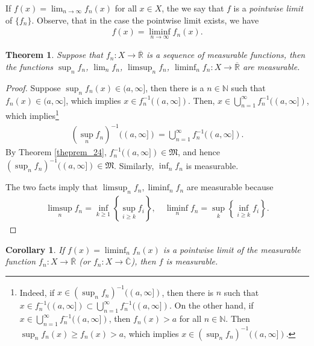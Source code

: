 \documentclass[11pt]{book}
\newtheorem{theorem}{Theorem}[chapter]
\newtheorem{corollary}{Corollary}[theorem]
\theoremstyle{definition}
\numberwithin{equation}{chapter}
\begin{document}
If $f(x) = \lim_{n\to\infty} f_n(x)$ for all $x \in X$, the we say that $f$ is a {\em pointwise limit} of $\{f_n\}$. Observe, that in the case the pointwise limit exists, we have
\begin{align*}
    f(x) = \liminf_{n\to\infty} f_n(x).
\end{align*}

\medskip

\begin{theorem}\label{theorem_25}
Suppose that $f_n: X \to \overline{\mathbb{R}}$ is a sequence of measurable functions, then the functions $\sup_n f_n$, $\lim_n f_n$, $\limsup_n f_n$, $\liminf_n f_n: X \to \overline{\mathbb{R}}$ are measurable.
\end{theorem}
\begin{proof}
Suppose $\sup_n f_n(x) \in (a,\infty]$, then there is a $n \in \mathbb{N}$ such that $f_n(x) \in (a,\infty]$, which implies $x \in f_n^{-1}((a,\infty])$. Then, $x \in \bigcup^\infty_{n=1} f_n^{-1}((a,\infty])$, which implies\footnote{Indeed, if $x \in \left(\sup_n f_n\right)^{-1}((a,\infty])$, then there is $n$ such that $x \in f_n^{-1}((a,\infty]) \subset \bigcup^\infty_{n=1} f_n^{-1}((a,\infty])$. On the other hand, if $x \in \bigcup^\infty_{n=1} f_n^{-1}((a,\infty])$, then $f_n(x) > a$ for all $n \in \mathbb{N}$. Then $\sup_n f_n(x) \geq f_n(x) > a$, which implies $x \in \left(\sup_n f_n\right)^{-1}((a,\infty])$.}
\begin{align*}
    \left(\sup_n f_n\right)^{-1}((a,\infty]) = \bigcup^\infty_{n=1} f_n^{-1}((a,\infty]).
\end{align*}
By Theorem \ref{theprem_24}, $f_n^{-1}((a,\infty]) \in \mathfrak{M}$, and hence $\left(\sup_n f_n\right)^{-1}((a,\infty]) \in \mathfrak{M}$. Similarly, $\inf_n f_n$ is measurable.

The two facts imply that $\limsup_n f_n, \liminf_n f_n$ are measurable because
\begin{align*}
    \limsup_n f_n = \inf_{k\geq 1} \left\{\sup_{i\geq k}f_i\right\}, \quad \liminf_n f_n = \sup_k \left\{\inf_{i\geq k}f_i\right\}.
\end{align*}
\end{proof}

\medskip

\begin{corollary}\label{coro_251}
If $f(x) = \liminf_n f_n(x)$ is a pointwise limit of the measurable function $f_n: X \to \overline{\mathbb{R}}$ (or $f_n: X \to \overline{\mathbb{C}}$), then $f$ is measurable.
\end{corollary}
\end{document}
